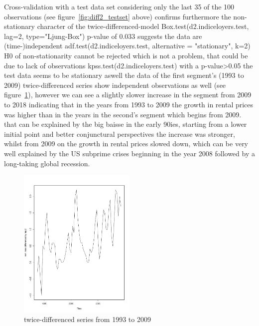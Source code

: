 \documentclass[11pt,a4paper]{article}
\begin{document}
Cross-validation with a test data set considering only the last 35 of the 100 observations (see figure~\ref{fig:diff2_testset} above) confirms furthermore the non-stationary character of the twice-differenced-model 
Box.test(d2.indiceloyers.test, lag=2, type="Ljung-Box") p-value of 0.033 suggests the data are (time-)independent
adf.test(d2.indiceloyers.test, alternative = "stationary", k=2)  H0 of non-stationarity cannot be rejected which is not a problem, that could be due to lack of observations
kpss.test(d2.indiceloyers.test)  with a p-value>0.05 the test data seems to be stationary aswell
the data of the first segment's (1993 to 2009) twice-differenced series show independent observations as well (see figure~\ref{fig:diff2_trainingset}), however we can see a slightly slower increase in the segment from 2009 to 2018 indicating that in the years from 1993 to 2009 the growth in rental prices was higher than in the years in the second's segment which begins from 2009. that can be explained by the big baisse in the early 90ies, starting from a lower initial point and better conjunctural perspectives the increase was stronger, whilst from 2009 on the growth in rental prices slowed down, which can be very well explained by the US subprime crises beginning in the year 2008 followed by a long-taking global recession.
\begin{figure}[!htb]
\centering
\includegraphics[angle=0,
width=0.5\textwidth]{diff2_trainingset}
\caption{twice-differenced series from 1993 to 2009
\label{fig:diff2_trainingset}}
\end{figure}
\end{document}
